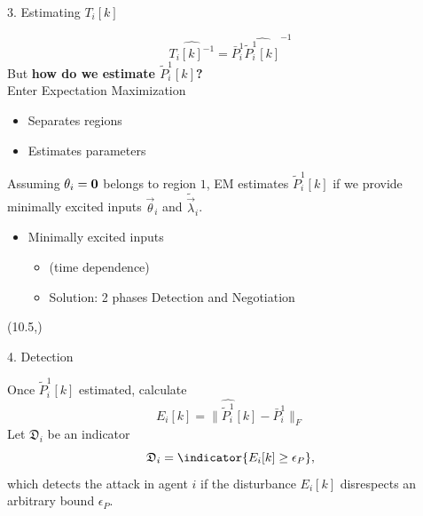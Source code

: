 \documentclass[presentation]{beamer}
\begin{document}
\begin{frame}
\begin{textblock}{5.1}
\begin{block}{3. Estimating $T_{i}[k]$}
\begin{center}
\begin{minipage}[c]{.95\textwidth}
\begin{equation}
              \widehat{{T_{i}[k]}^{-1}}=\bar{P}_{i}^{1}{\widehat{\tilde{P}_{i}^{1}[k]}}^{-1}
            \end{equation}
            {\color{ietr_brightblue} But {\large \textbf{how do we estimate $\tilde{P}_{i}^{1}[k]$?}}}
            \\[.5ex]
            Enter Expectation Maximization
            \begin{itemize}
              \item Separates regions
              \item Estimates parameters
            \end{itemize}
            \vspace{1ex}
            Assuming ${\theta_{i}=\mathbf{0}}$ belongs to region $1$, EM estimates $\tilde{P}_{i}^{1}[k]$ if we provide minimally excited inputs $\vec{\theta}_{i}$ and $\tilde{\vec{\lambda}}_{i}$.
          \end{minipage}
          \begin{itemize}
            \item Minimally excited inputs
                  \begin{itemize}
                    \item {} (time dependence)
                    \item Solution: 2 phases Detection and Negotiation
                  \end{itemize}
          \end{itemize}
      \vspace{1ex}
        \end{center}
      \end{block}
    \end{textblock}

    \begin{textblock}{5.1}(10.5,\secrow)
      \begin{block}{4. Detection }
      \begin{center}
        \begin{minipage}[c]{.95\textwidth}
          Once $\tilde{P}_{i}^{1}[k]$ estimated, calculate
          \begin{equation}
            E_{i}[k] =\|\widehat{\tilde{P}_{i}^{1}}[k]-\bar{P}_{i}^{1}\|_{F}
          \end{equation}
Let ${\mathfrak{D}_{i}}$ be an indicator
\begin{equation}
  \label{eq:2}
  \mathfrak{D}_{i}=\indicator{E_{i}[k]\geq\epsilon_{P}},
\end{equation}
which detects the attack in agent $i$
if the disturbance $E_{i}[k]$ disrespects an arbitrary bound $\epsilon_{P}$.
        \end{minipage}
      \end{center}
    \end{block}
  \end{textblock}


\end{frame}
\end{document}

